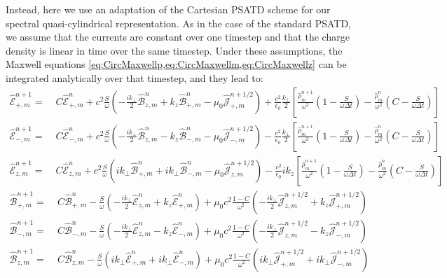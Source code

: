\documentclass[1p,times]{elsarticle}
\newcommand{\tB}[2]{\spectral{B}_{#1,m}^{#2}}
\newcommand{\tE}[2]{\spectral{E}_{#1,m}^{#2}}
\newcommand{\tj}[2]{\spectral{J}_{#1,m}^{#2}}
\newcommand{\trho}[1]{\spectral{\rho}_{m}^{#1}}
\newcommand{\spectral}[1]{\hat{\mathcal{#1}}}
\begin{document}
Instead, here we use an adaptation of the Cartesian PSATD scheme \citep{Haber}
for our spectral quasi-cylindrical representation. As in the case of the standard
PSATD, we assume that the currents are constant over one timestep and
that the charge density is linear in time over the same timestep. Under these
assumptions, the Maxwell equations \cref{eq:CircMaxwellp,eq:CircMaxwellm,eq:CircMaxwellz} can be integrated
analytically over that timestep, and they lead to:
\begin{subequations}
\begin{align}
\tE{+}{n+1} = \; & C \tE{+}{n} + 
c^2\frac{S}{\omega}\left(-\frac{ik_\perp }{2} \tB{z}{n} + k_z\tB{+}{n}
- \mu_0 \tj{+}{n+1/2} \right) + \frac{c^2}{\epsilon_0}
\frac{k_\perp}{2}\left[ \frac{\trho{n+1}}{\omega^2}\left(
  1 - \frac{S}{\omega\Delta t}\right) -
\frac{\trho{n}}{\omega^2}\left( C -\frac{S}{\omega\Delta t}\right)\right]  & \\
\tE{-}{n+1} =\; & C \tE{-}{n} +
c^2\frac{S}{\omega}\left(- \frac{ik_\perp }{2} \tB{z}{n} - k_z\tB{-}{n}
- \mu_0 \tj{-}{n+1/2} \right) - \frac{c^2}{\epsilon_0}
\frac{k_\perp}{2}\left[ \frac{\trho{n+1}}{\omega^2}\left(
  1 - \frac{S}{\omega\Delta t}\right) - \frac{\trho{n}}{\omega^2}
\left( C - \frac{S}{\omega\Delta t}\right)\right]  &\\
\tE{z}{n+1} =\; & C \tE{z}{n} + 
c^2\frac{S}{\omega}\left(ik_\perp \tB{+}{n} + ik_\perp \tB{-}{n}
- \mu_0 \tj{z}{n+1/2} \right) - \frac{c^2}{\epsilon_0}
ik_z\left[ \frac{\trho{n+1}}{\omega^2}\left(
  1 - \frac{S}{\omega\Delta t}\right) - \frac{\trho{n}}{\omega^2}
\left( C - \frac{S}{\omega\Delta t}\right)\right]  &
\end{align}
\end{subequations}
\begin{subequations}
\begin{align}
\tB{+}{n+1} = \; & C \tB{+}{n} - 
\frac{S}{\omega}\left(-\frac{ik_\perp }{2} \tE{z}{n} + k_z\tE{+}{n}
\right) + \mu_0 c^2\frac{1-C}{\omega^2} \left( -\frac{ik_\perp }{2}
  \tj{z}{n+1/2} + k_z \tj{+}{n+1/2} \right)& \\
\tB{-}{n+1} =\; & C \tB{-}{n} - 
\frac{S}{\omega}\left(- \frac{ik_\perp }{2} \tE{z}{n} - k_z\tE{-}{n}
\right) + \mu_0 c^2\frac{1-C}{\omega^2} \left( - \frac{ik_\perp }{2}
  \tj{z}{n+1/2} - k_z \tj{-}{n+1/2} \right) &\\
\tB{z}{n+1} =\; & C \tB{z}{n} - 
\frac{S}{\omega}\left(ik_\perp \tE{+}{n} + ik_\perp \tE{-}{n}
\right) + \mu_0 c^2\frac{1-C}{\omega^2} \left( ik_\perp
  \tj{+}{n+1/2} + ik_\perp \tj{-}{n+1/2} \right)&
\end{align}
\end{subequations}
\end{document}
